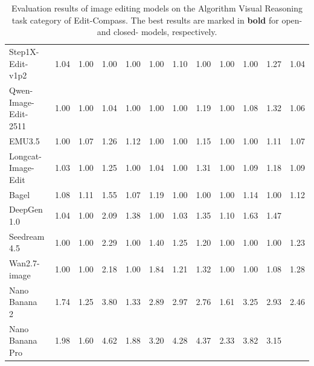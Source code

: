 \documentclass{llmxive}
\providecommand{\bench}{Edit-Compass}
\begin{document}
\begin{table}[t]
{\begin{tabular}{l|cccccccccc|c}
            Step1X-Edit-v1p2~\cite{liu2025step1x}
            & 1.04 & 1.00 & 1.00 & 1.00 & 1.00 & 1.10 & 1.00 & 1.00 & 1.00 & 1.27
            & \cellcolor[HTML]{C8C8C8}1.04 \\

            Qwen-Image-Edit-2511~\cite{wu2025qwen}
            & 1.00 & 1.00 & 1.04 & 1.00 & 1.00 & 1.00 & 1.19 & 1.00 & 1.08 & 1.32
            & \cellcolor[HTML]{C8C8C8}1.06 \\

            
            EMU3.5~\cite{cui2025emu3}
            & 1.00 & 1.07 & 1.26 & 1.12 & 1.00 & 1.00 & 1.15 & 1.00 & 1.00 & 1.11
            & \cellcolor[HTML]{C8C8C8}1.07 \\


            Longcat-Image-Edit~\cite{team2025longcat}
            & 1.03 & 1.00 & 1.25 & 1.00 & 1.04 & 1.00 & 1.31 & 1.00 & 1.09 & 1.18
            & \cellcolor[HTML]{C8C8C8}1.09 \\

            
            Bagel~\cite{deng2025emerging}
            & 1.08 & 1.11 & 1.55 & 1.07 & 1.19 & 1.00 & 1.00 & 1.00 & 1.14 & 1.00
            & \cellcolor[HTML]{C8C8C8}1.12 \\


            DeepGen 1.0~\cite{wang2026deepgen}
            & 1.04 & 1.00 & 2.09 & 1.38 & 1.00 & 1.03 & 1.35 & 1.10 & 1.63 & 1.47
            & \cellcolor[HTML]{C8C8C8}{\textbf{1.31}} \\

            \midrule

            Seedream 4.5~\cite{seedream2025seedream}
            & 1.00 & 1.00 & 2.29 & 1.00 & 1.40 & 1.25 & 1.20 & 1.00 & 1.00 & 1.00
            & \cellcolor[HTML]{C8C8C8}1.23 \\

            Wan2.7-image~\cite{nanobananapro}
            & 1.00 & 1.00 & 2.18 & 1.00 & 1.84 & 1.21 & 1.32 & 1.00 & 1.00 & 1.08
            & \cellcolor[HTML]{C8C8C8} 1.28  \\
           
            Nano Banana 2~\cite{gemini3pro}
            & 1.74 & 1.25 & 3.80 & 1.33 & 2.89 & 2.97 & 2.76 & 1.61 & 3.25 & 2.93
            & \cellcolor[HTML]{C8C8C8} 2.46  \\

            Nano Banana Pro~\cite{nanobananapro}
            & 1.98 & 1.60 & 4.62 & 1.88 & 3.20 & 4.28 & 4.37 & 2.33 & 3.82 & 3.15
            & \cellcolor[HTML]{C8C8C8}{\textbf{3.16}} \\

  

            \bottomrule
        \end{tabular}%
    }
    \vspace{-1.0em}
\caption{
    Evaluation results of image editing models on the Algorithm Visual Reasoning task category of {\bench}. 
    The best results are marked in \textbf{bold} for
    { open-} and { closed-} models, respectively.}
\label{tab:Algorithm Visual Reasoning}
\end{table}
\end{document}
